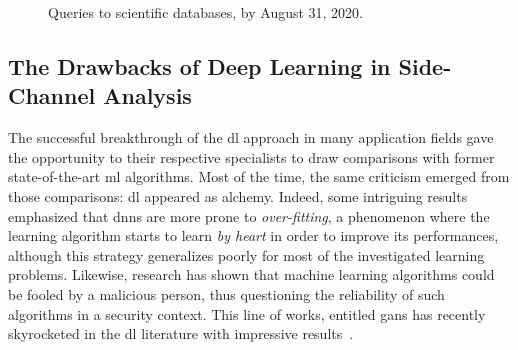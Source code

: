 \begin{figure}
	\centering
	\caption{Queries to scientific databases, by August 31, 2020.}
	\label{fig:growing_interest}
\end{figure}


\subsection{The Drawbacks of Deep Learning in Side-Channel Analysis}
\label{sec:drawbacks_dl}
The successful breakthrough of the \gls{dl} approach in many application fields gave the opportunity to their respective specialists to draw comparisons with former state-of-the-art \gls{ml} algorithms.
Most of the time, the same criticism emerged from those comparisons: \gls{dl} appeared as alchemy.
Indeed, some intriguing results emphasized that \glspl{dnn} are more prone to \emph{over-fitting}, a phenomenon where the learning algorithm starts to learn \emph{by heart} in order to improve its performances, although this strategy generalizes poorly for most of the investigated learning problems.
Likewise, research has shown that machine learning algorithms could be fooled by a malicious person, thus questioning the reliability of such algorithms in a security context.
This line of works, entitled \glspl{gan} has recently skyrocketed in the \gls{dl} literature with impressive results~\cite{goodfellow_generative_2014}.

